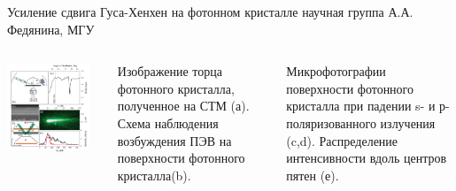 \documentclass[9pt, compress, xcolor=table]{beamer}
\begin{document}
\begin{frame}{Усиление сдвига Гуса-Хенхен на фотонном кристалле }
научная группа А.А. Федянина, МГУ
\begin{columns}[c]
\column{3in}
\begin{center}
\includegraphics[width=0.9\textwidth]{gh2}
\end{center}

\column{1.5in}

Изображение торца фотонного кристалла, полученное на СТМ (а). Схема наблюдения возбуждения
ПЭВ на поверхности фотонного кристалла(b).

Микрофотографии поверхности фотонного кристалла при падении s- и р-поляризованного излучения (c,d). Распределение интенсивности вдоль центров пятен (е).

\end{columns}


\end{frame}
\end{document}
